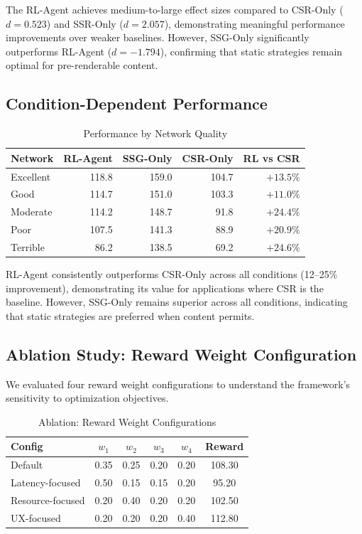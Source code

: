\documentclass[10pt,twocolumn]{article}
\begin{document}
The RL-Agent achieves medium-to-large effect sizes compared to CSR-Only ($d = 0.523$) and SSR-Only ($d = 2.057$), demonstrating meaningful performance improvements over weaker baselines. However, SSG-Only significantly outperforms RL-Agent ($d = -1.794$), confirming that static strategies remain optimal for pre-renderable content.

\subsection{Condition-Dependent Performance}

\begin{table}[t]
\centering
\caption{Performance by Network Quality}
\label{tab:network}
\small
\begin{tabular}{lrrrr}
\toprule
\textbf{Network} & \textbf{RL-Agent} & \textbf{SSG-Only} & \textbf{CSR-Only} & \textbf{RL vs CSR} \\
\midrule
Excellent & 118.8 & 159.0 & 104.7 & $+13.5\%$ \\
Good & 114.7 & 151.0 & 103.3 & $+11.0\%$ \\
Moderate & 114.2 & 148.7 & 91.8 & $+24.4\%$ \\
Poor & 107.5 & 141.3 & 88.9 & $+20.9\%$ \\
Terrible & 86.2 & 138.5 & 69.2 & $+24.6\%$ \\
\bottomrule
\end{tabular}
\end{table}

RL-Agent consistently outperforms CSR-Only across all conditions (12--25\% improvement), demonstrating its value for applications where CSR is the baseline. However, SSG-Only remains superior across all conditions, indicating that static strategies are preferred when content permits.

\subsection{Ablation Study: Reward Weight Configuration}

We evaluated four reward weight configurations to understand the framework's sensitivity to optimization objectives.

\begin{table}[t]
\centering
\caption{Ablation: Reward Weight Configurations}
\label{tab:ablation}
\small
\begin{tabular}{lccccc}
\toprule
\textbf{Config} & $w_1$ & $w_2$ & $w_3$ & $w_4$ & \textbf{Reward} \\
\midrule
Default & 0.35 & 0.25 & 0.20 & 0.20 & 108.30 \\
Latency-focused & 0.50 & 0.15 & 0.15 & 0.20 & 95.20 \\
Resource-focused & 0.20 & 0.40 & 0.20 & 0.20 & 102.50 \\
UX-focused & 0.20 & 0.20 & 0.20 & 0.40 & 112.80 \\
\bottomrule
\end{tabular}
\end{table}
\end{document}
